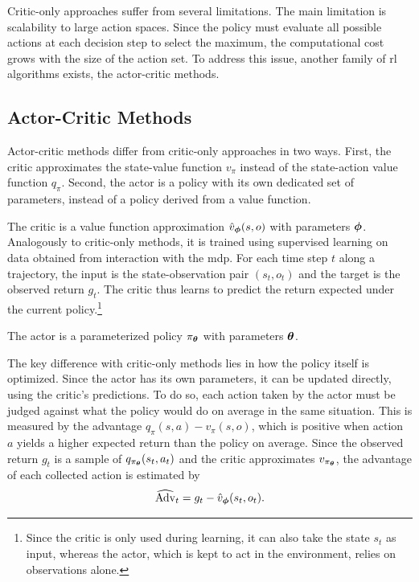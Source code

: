 Critic-only approaches suffer from several limitations.
The main limitation is scalability to large action spaces.
Since the policy must evaluate all possible actions at each decision step to select the maximum, the computational cost grows with the size of the action set.
To address this issue, another family of \gls{rl} algorithms exists, the actor-critic methods.

\subsection{Actor-Critic Methods}
\label{subsec:actor_critic}

Actor-critic methods differ from critic-only approaches in two ways.
First, the critic approximates the state-value function \(v_\pi\) instead of the state-action value function \(q_\pi\).
Second, the actor is a policy with its own dedicated set of parameters, instead of a policy derived from a value function.

The critic is a value function approximation \(\hat{v}_{\boldsymbol{\phi}}(s, o)\) with parameters \(\boldsymbol{\phi}\).
Analogously to critic-only methods, it is trained using supervised learning on data obtained from interaction with the \gls{mdp}.
For each time step \(t\) along a trajectory, the input is the state-observation pair \((s_t, o_t)\) and the target is the observed return \(g_t\).
The critic thus learns to predict the return expected under the current policy.\footnote{Since the critic is only used during learning, it can also take the state \(s_t\) as input, whereas the actor, which is kept to act in the environment, relies on observations alone.}

The actor is a parameterized policy \(\pi_{\boldsymbol{\theta}}\) with parameters \(\boldsymbol{\theta}\).

The key difference with critic-only methods lies in how the policy itself is optimized.
Since the actor has its own parameters, it can be updated directly, using the critic's predictions.
To do so, each action taken by the actor must be judged against what the policy would do on average in the same situation.
This is measured by the advantage \(q_\pi(s, a) - v_\pi(s, o)\), which is positive when action \(a\) yields a higher expected return than the policy on average.
Since the observed return \(g_t\) is a sample of \(q_{\pi_{\boldsymbol{\theta}}}(s_t, a_t)\) and the critic approximates \(v_{\pi_{\boldsymbol{\theta}}}\), the advantage of each collected action is estimated by
\[
\widehat{\mathrm{Adv}}_t = g_t - \hat{v}_{\boldsymbol{\phi}}(s_t, o_t).
\]

